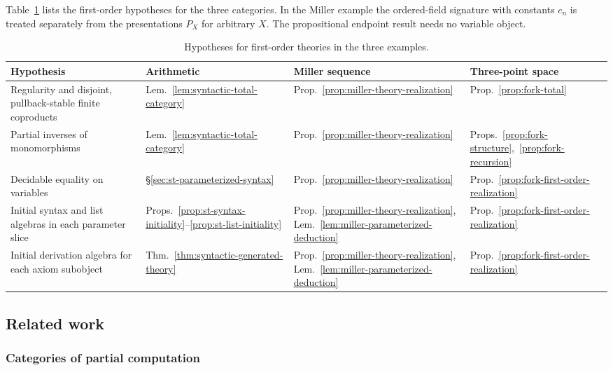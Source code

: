 Table~\ref{tab:first-order-examples} lists the first-order hypotheses
for the three categories. In the Miller example the ordered-field
signature with constants $c_n$ is treated separately from the presentations
$P_X$ for arbitrary $X$. The propositional endpoint result needs no
variable object.
\begin{table}[htbp]
\centering
\caption{Hypotheses for first-order theories in the three examples.}
\label{tab:first-order-examples}
\small
\renewcommand{\arraystretch}{1.22}
\begin{tabular}{@{}p{.35\linewidth}lll@{}}
\hline
Hypothesis & Arithmetic & Miller sequence & Three-point space \\
\hline
\raggedright Regularity and disjoint, pullback-stable finite coproducts
  & Lem.~\ref{lem:syntactic-total-category}
  & Prop.~\ref{prop:miller-theory-realization}
  & Prop.~\ref{prop:fork-total} \\
\raggedright Partial inverses of monomorphisms
  & Lem.~\ref{lem:syntactic-total-category}
  & Prop.~\ref{prop:miller-theory-realization}
  & Props.~\ref{prop:fork-structure},~\ref{prop:fork-recursion} \\
\raggedright Decidable equality on variables
  & \S\ref{sec:st-parameterized-syntax}
  & Prop.~\ref{prop:miller-theory-realization}
  & Prop.~\ref{prop:fork-first-order-realization} \\
\raggedright Initial syntax and list algebras in each parameter slice
  & Props.~\ref{prop:st-syntax-initiality}--\ref{prop:st-list-initiality}
  & Prop.~\ref{prop:miller-theory-realization}, Lem.~\ref{lem:miller-parameterized-deduction}
  & Prop.~\ref{prop:fork-first-order-realization} \\
\raggedright Initial derivation algebra for each axiom subobject
  & Thm.~\ref{thm:syntactic-generated-theory}
  & Prop.~\ref{prop:miller-theory-realization}, Lem.~\ref{lem:miller-parameterized-deduction}
  & Prop.~\ref{prop:fork-first-order-realization} \\
\hline
\end{tabular}
\end{table}

\subsection{Related work}

\subsubsection{Categories of partial computation}

